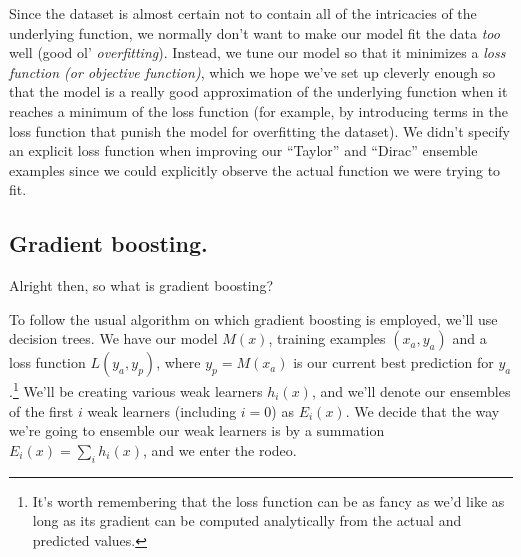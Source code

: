 \documentclass[../main/main.tex]{subfiles}
\begin{document}
Since the dataset is almost certain not to contain all of the intricacies of the underlying
function, we normally don't want to make our model fit the data \emph{too} well
(good ol' \emph{overfitting}). Instead, we tune our model so that it
minimizes a
\emph{loss function (or objective function)}, 
which we hope we've set up cleverly enough so that
the model is a really good approximation of the underlying function when it reaches a minimum
of the loss function (for example, by introducing terms in the loss function that punish the
model for overfitting the dataset). We didn't specify an explicit loss function when
improving our ``Taylor'' and ``Dirac'' ensemble examples since we could explicitly observe the
actual function we were trying to fit.


\subsection{Gradient boosting.}\label{gradient-boosting}



Alright then, so what is gradient boosting? 

To follow the usual algorithm
on which gradient boosting is employed, we'll use decision trees.
We have our model \(M(x)\), training examples \((x_a, y_a)\) and a loss function
\(L(y_a, y_p)\), where \(y_p = M(x_a)\) is our current best prediction for \(y_a\).\footnote{
  It's worth
  remembering that the loss function can be as fancy as we'd like as long as its gradient
  can be computed analytically from the actual and predicted values.
}
We'll be creating various weak learners \(h_i(x)\), and we'll denote our ensembles of the first
\(i\) weak learners (including \(i=0\)) as \(E_i(x)\). We decide that the way we're going
to ensemble our weak learners is by a summation \(E_i(x) = \sum_{i} h_i(x)\),
and we enter the rodeo.
\end{document}
